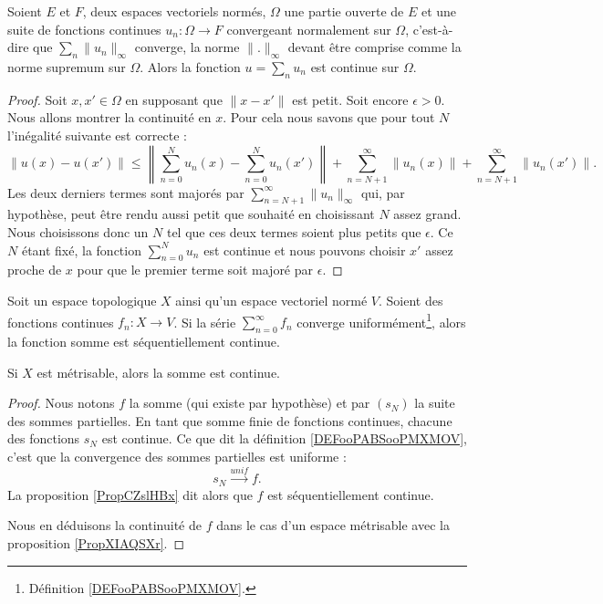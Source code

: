\begin{proposition} \label{PropOMBbwst}
	Soient \( E\) et \( F\), deux espaces vectoriels normés, \( \Omega\) une partie ouverte de \( E\) et une suite de fonctions continues \( u_n\colon \Omega\to F\) convergeant normalement sur \( \Omega\), c'est-à-dire que \( \sum_n\| u_n \|_{\infty}\) converge, la norme \( \| . \|_{\infty} \) devant être comprise comme la norme supremum sur \( \Omega\). Alors la fonction \( u=\sum_nu_n\) est continue sur \( \Omega\).
\end{proposition}

\begin{proof}
	Soit \( x,x'\in \Omega\) en supposant que \( \| x-x' \|\) est petit. Soit encore \( \epsilon>0\). Nous allons montrer la continuité en \( x\). Pour cela nous savons que pour tout \( N\) l'inégalité suivante est correcte :
	\begin{equation}
		\| u(x)-u(x') \|\leq \left\|  \sum_{n=0}^Nu_n(x)-\sum_{n=0}^{N}u_n(x') \right\|+\sum_{n=N+1}^{\infty}\| u_n(x) \|+\sum_{n=N+1}^{\infty}\| u_n(x') \|.
	\end{equation}
	Les deux derniers termes sont majorés par \( \sum_{n=N+1}^{\infty}\| u_n \|_{\infty}\) qui, par hypothèse, peut être rendu aussi petit que souhaité en choisissant \( N\) assez grand. Nous choisissons donc un \( N\) tel que ces deux termes soient plus petits que \( \epsilon\). Ce \( N\) étant fixé, la fonction \( \sum_{n=0}^{N}u_n\) est continue et nous pouvons choisir \( x'\) assez proche de \( x\) pour que le premier terme soit majoré par \( \epsilon\).
\end{proof}

\begin{theorem}			\label{ThoSerUnifCont}
	Soit un espace topologique \( X\) ainsi qu'un espace vectoriel normé \( V\). Soient des fonctions continues \( f_n\colon X\to V\). Si la série \( \sum_{n=0}^{\infty}f_n\) converge uniformément\footnote{Définition \ref{DEFooPABSooPMXMOV}.}, alors la fonction somme est séquentiellement continue.

	Si \( X\) est métrisable, alors la somme est continue.
\end{theorem}

\begin{proof}
	Nous notons \( f\) la somme (qui existe par hypothèse) et par \( (s_N)\) la suite des sommes partielles. En tant que somme finie de fonctions continues, chacune des fonctions \( s_N\) est continue. Ce que dit la définition \ref{DEFooPABSooPMXMOV}, c'est que la convergence des sommes partielles est uniforme :
	\begin{equation}
		s_N\stackrel{unif}{\longrightarrow}f.
	\end{equation}
	La proposition \ref{PropCZslHBx} dit alors que \( f\) est séquentiellement continue.

	Nous en déduisons la continuité de \( f\) dans le cas d'un espace métrisable avec la proposition \ref{PropXIAQSXr}.
\end{proof}

